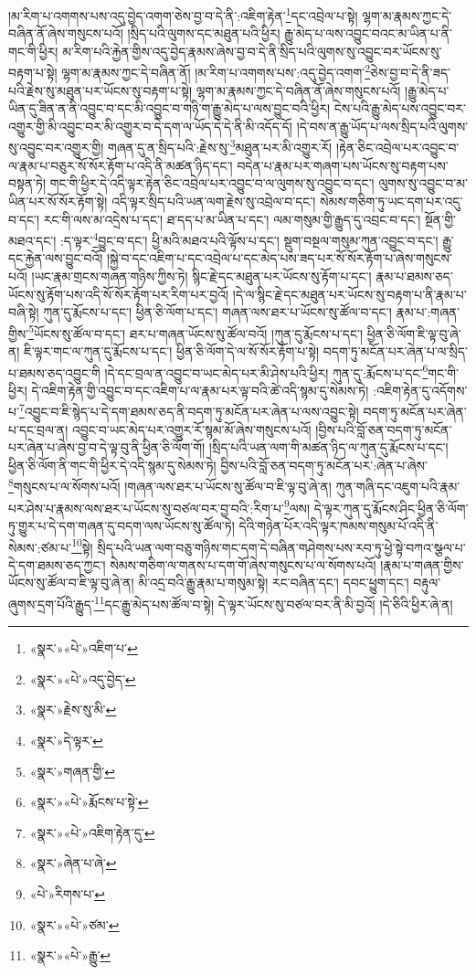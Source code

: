 །མ་རིག་པ་འགགས་པས་འདུ་བྱེད་འགག་ཅེས་བྱ་བ་དེ་ནི་:འཇིག་རྟེན་\footnote{«སྣར་»«པེ་»འཇིག་པ་}དང་འབྲེལ་པ་སྟེ། ལྷག་མ་རྣམས་ཀྱང་དེ་བཞིན་ནོ་ཞེས་གསུངས་པའོ། །སྲིད་པའི་ལུགས་དང་མཐུན་པའི་ཕྱིར། རྒྱུ་མེད་པ་ལས་འབྱུང་བའང་མ་ཡིན་པ་ནི་གང་གི་ཕྱིར། མ་རིག་པའི་རྐྱེན་གྱིས་འདུ་བྱེད་རྣམས་ཞེས་བྱ་བ་དེ་ནི་སྲིད་པའི་ལུགས་སུ་འབྱུང་བར་ཡོངས་སུ་བརྟག་པ་སྟེ། ལྷག་མ་རྣམས་ཀྱང་དེ་བཞིན་ནོ། །མ་རིག་པ་འགགས་པས་:འདུ་བྱེད་འགག་\footnote{«སྣར་»«པེ་»འདུ་བྱེད་}ཅེས་བྱ་བ་དེ་ནི་ཟད་པའི་རྗེས་སུ་མཐུན་པར་ཡོངས་སུ་བརྟག་པ་སྟེ། ལྷག་མ་རྣམས་ཀྱང་དེ་བཞིན་ནོ་ཞེས་གསུངས་པའོ། །རྒྱུ་མེད་པ་ཡིན་དུ་ཟིན་ན་ནི་འབྱུང་བ་དང་མི་འབྱུང་བ་གཉི་ག་རྒྱུ་མེད་པ་ལས་བྱུང་བའི་ཕྱིར། ངེས་པའི་རྒྱུ་མེད་པས་འབྱུང་བར་འགྱུར་གྱི་མི་འབྱུང་བར་མི་འགྱུར་བ་དེ་དག་ལ་ཡོད་དེ་དེ་ནི་མི་འདོད་དོ། །དེ་བས་ན་རྒྱུ་ཡོད་པ་ལས་སྲིད་པའི་ལུགས་སུ་འབྱུང་བར་འགྱུར་གྱི། གཞན་དུ་ན་སྲིད་པའི་:རྗེས་སུ་\footnote{«སྣར་»རྗེས་སུ་མི་}མཐུན་པར་མི་འགྱུར་རོ། །རྟེན་ཅིང་འབྲེལ་པར་འབྱུང་བ་ལ་རྣམ་པ་བཅུར་སོ་སོར་རྟོག་པ་འདི་ནི་མཚན་ཉིད་དང་། བདེན་པ་རྣམ་པར་གཞག་པས་ཡོངས་སུ་བརྟག་པས་བསྟན་ཏེ། གང་གི་ཕྱིར་དེ་འདི་ལྟར་རྟེན་ཅིང་འབྲེལ་པར་འབྱུང་བ་ལ་ལུགས་སུ་འབྱུང་བ་དང་། ལུགས་སུ་འབྱུང་བ་མ་ཡིན་པར་སོ་སོར་རྟོག་སྟེ། འདི་ལྟར་སྲིད་པའི་ཡན་ལག་རྗེས་སུ་འབྲེལ་བ་དང་། སེམས་གཅིག་ཏུ་ཡང་དག་པར་འདུ་བ་དང་། རང་གི་ལས་མ་འདྲེས་པ་དང་། ཐ་དད་པ་མ་ཡིན་པ་དང་། ལམ་གསུམ་གྱི་རྒྱུད་དུ་འབྲང་བ་དང་། སྔོན་གྱི་མཐའ་དང་། :ད་ལྟར་\footnote{«སྣར་»དེ་ལྟར་}བྱུང་བ་དང་། ཕྱི་མའི་མཐའ་པའི་ལྟོས་པ་དང་། སྡུག་བསྔལ་གསུམ་ཀུན་འབྱུང་བ་དང་། རྒྱུ་དང་རྐྱེན་ལས་བྱུང་བའོ། །སྐྱེ་བ་དང་འཇིག་པ་དང་འབྲེལ་པ་དང་མེད་པས་ཟད་པར་སོ་སོར་རྟོག་པ་ཞེས་གསུངས་པའོ། །ཡང་རྣམ་གྲངས་གཞན་གཉིས་ཀྱིས་ཏེ། སྙིང་རྗེ་དང་མཐུན་པར་ཡོངས་སུ་རྟོག་པ་དང་། རྣམ་པ་ཐམས་ཅད་ཡོངས་སུ་རྟོག་པས་འདི་སོ་སོར་རྟོག་པར་རིག་པར་བྱའོ། །དེ་ལ་སྙིང་རྗེ་དང་མཐུན་པར་ཡོངས་སུ་བརྟག་པ་ནི་རྣམ་པ་བཞི་སྟེ། ཀུན་དུ་རྨོངས་པ་དང་། ཕྱིན་ཅི་ལོག་པ་དང་། གཞན་ལས་ཐར་པ་ཡོངས་སུ་ཚོལ་བ་དང་། རྣམ་པ་:གཞན་གྱིས་\footnote{«སྣར་»གཞན་གྱི་}ཡོངས་སུ་ཚོལ་བ་དང་། ཐར་པ་གཞན་ཡོངས་སུ་ཚོལ་བའོ། །ཀུན་དུ་རྨོངས་པ་དང་། ཕྱིན་ཅི་ལོག་ཇི་ལྟ་བུ་ཞེ་ན། ཇི་ལྟར་གང་ལ་ཀུན་དུ་རྨོངས་པ་དང་། ཕྱིན་ཅི་ལོག་དེ་ལ་སོ་སོར་རྟོག་པ་སྟེ། བདག་ཏུ་མངོན་པར་ཞེན་པ་ལ་སྲིད་པ་ཐམས་ཅད་འབྱུང་གི །དེ་དང་བྲལ་ན་འབྱུང་བ་ཡང་མེད་པར་མི་ཤེས་པའི་ཕྱིར། ཀུན་དུ་:རྨོངས་པ་དང་\footnote{«སྣར་»«པེ་»རྨོངས་པ་སྟེ་}གང་གི་ཕྱིར། དེ་འཇིག་རྟེན་གྱི་འབྱུང་བ་དང་འཇིག་པ་ལ་རྣམ་པར་ལྟ་བའི་ཚེ་འདི་སྙམ་དུ་སེམས་ཏེ། :འཇིག་རྟེན་དུ་འདོགས་པ་\footnote{«སྣར་»«པེ་»འཇིག་རྟེན་དུ་}འབྱུང་བ་ཇི་སྙེད་པ་དེ་དག་ཐམས་ཅད་ནི་བདག་ཏུ་མངོན་པར་ཞེན་པ་ལས་འབྱུང་སྟེ། བདག་ཏུ་མངོན་པར་ཞེན་པ་དང་བྲལ་ན། འབྱུང་བ་ཡང་མེད་པར་འགྱུར་རོ་སྙམ་མོ་ཞེས་གསུངས་པའོ། །བྱིས་པའི་བློ་ཅན་བདག་ཏུ་མངོན་པར་ཞེན་པ་ཞེས་བྱ་བ་དེ་ལྟ་བུ་ནི་ཕྱིན་ཅི་ལོག་གོ། །སྲིད་པའི་ཡན་ལག་གི་མཚན་ཉིད་ལ་ཀུན་དུ་རྨོངས་པ་དང་། ཕྱིན་ཅི་ལོག་ནི་གང་གི་ཕྱིར་དེ་འདི་སྙམ་དུ་སེམས་ཏེ། བྱིས་པའི་བློ་ཅན་བདག་ཏུ་མངོན་པར་:ཞེན་པ་ཞེས་\footnote{«སྣར་»ཞེན་པ་ཞེ་}གསུངས་པ་ལ་སོགས་པའོ། །གཞན་ལས་ཐར་པ་ཡོངས་སུ་ཚོལ་བ་ཇི་ལྟ་བུ་ཞེ་ན། ཀུན་གཞི་དང་འཇུག་པའི་རྣམ་པར་ཤེས་པ་རྣམས་ལས་ཐར་པ་ཡོངས་སུ་བཙལ་བར་བྱ་བའི་:རིག་པ་\footnote{«པེ་»རིགས་པ་}ལས། དེ་ལྟར་ཀུན་དུ་རྨོངས་ཤིང་ཕྱིན་ཅི་ལོག་ཏུ་གྱུར་པ་དེ་དག་གཞན་དུ་བདག་ལས་ཡོངས་སུ་ཚོལ་ཏེ། དེའི་གཉེན་པོར་འདི་ལྟར་ཁམས་གསུམ་པོ་འདི་ནི་སེམས་:ཙམ་པ་\footnote{«སྣར་»«པེ་»ཙམ་}སྟེ། སྲིད་པའི་ཡན་ལག་བཅུ་གཉིས་གང་དག་དེ་བཞིན་གཤེགས་པས་རབ་ཏུ་ཕྱེ་སྟེ་བཀའ་སྩལ་པ་དེ་དག་ཐམས་ཅད་ཀྱང་། སེམས་གཅིག་ལ་གནས་པ་དག་གོ་ཞེས་གསུངས་པ་ལ་སོགས་པའོ། །རྣམ་པ་གཞན་གྱིས་ཡོངས་སུ་ཚོལ་བ་ཇི་ལྟ་བུ་ཞེ་ན། མི་འདྲ་བའི་རྒྱུ་རྣམ་པ་གསུམ་སྟེ། རང་བཞིན་དང་། དབང་ཕྱུག་དང་། བརྟུལ་ཞུགས་དྲག་པོའི་རྒྱུད་\footnote{«སྣར་»«པེ་»རྒྱུ་}དང་རྒྱུ་མེད་པས་ཚོལ་བ་སྟེ། དེ་ལྟར་ཡོངས་སུ་བཙལ་བར་ནི་མི་བྱའོ། །དེ་ཅིའི་ཕྱིར་ཞེ་ན། 